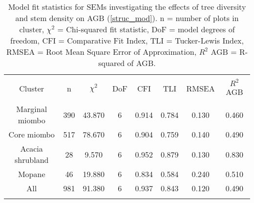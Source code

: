 
\begin{table}[!htbp] \centering 
  \caption{Model fit statistics for SEMs investigating the effects of tree diversity and stem density on AGB (\autoref{struc_mod}). n = number of plots in cluster, $\chi^{2}$ = Chi-squared fit statistic, DoF = model degrees of freedom, CFI = Comparative Fit Index, TLI = Tucker-Lewis Index, RMSEA = Root Mean Square Error of Approximation, $R^{2}$ AGB = R-squared of AGB.} 
  \label{struc_model_fit_clust_stats} 
\begin{tabular}{@{\extracolsep{0pt}} cccccccc} 
\\[-1.8ex]\hline 
\hline \\[-1.8ex] 
{Cluster} & {n} & {$\chi^{2}$} & {DoF} & {CFI} & {TLI} & {RMSEA} & {$R^{2}$ AGB} \\
\hline \\[-1.8ex] 
Marginal miombo & 390 & 43.870 & 6 & 0.914 & 0.784 & 0.130 & 0.460 \\ 
Core miombo & 517 & 78.670 & 6 & 0.904 & 0.759 & 0.140 & 0.490 \\ 
Acacia shrubland & 28 & 9.570 & 6 & 0.952 & 0.879 & 0.130 & 0.830 \\ 
Mopane & 46 & 19.880 & 6 & 0.834 & 0.584 & 0.240 & 0.510 \\ 
All & 981 & 91.380 & 6 & 0.937 & 0.843 & 0.120 & 0.490 \\ 
\hline \\[-1.8ex] 
\end{tabular} 
\end{table} 
